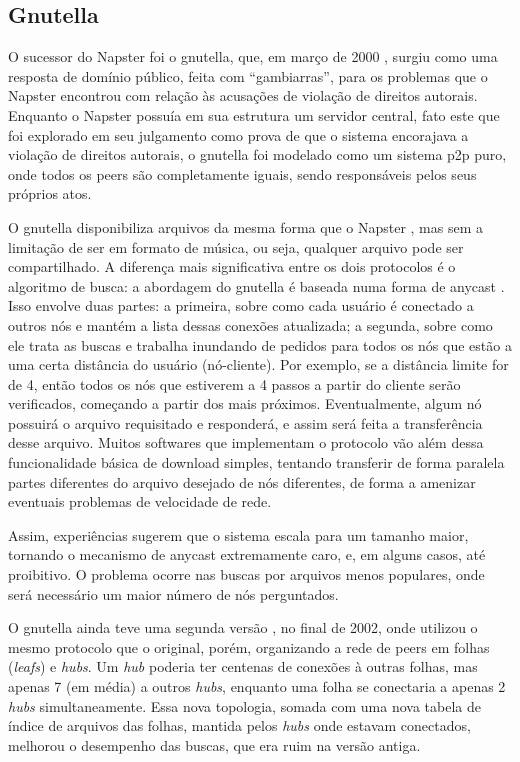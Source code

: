 \subsection*{Gnutella}

O sucessor do Napster foi o \gls{gnutella}, que, em março de 2000 \cite{wiki:gnutella},
surgiu como uma resposta de domínio público, feita com ``gambiarras'', para os problemas
que o Napster encontrou com relação às acusações de violação de direitos autorais.
Enquanto o Napster possuía em sua estrutura um servidor central, fato este que foi
explorado em seu julgamento como prova de que o sistema encorajava a violação de
direitos autorais, o \gls*{gnutella} foi modelado como um sistema \gls*{p2p} puro, onde
todos os \glspl*{peer} são completamente iguais, sendo responsáveis pelos seus próprios
atos.

O \gls*{gnutella} disponibiliza arquivos da mesma forma que o Napster \cite{book:birman}
, mas sem a limitação de ser em formato de música, ou seja, qualquer arquivo pode ser
compartilhado. A diferença mais significativa entre os dois protocolos é o algoritmo de
busca: a abordagem do \gls*{gnutella} é baseada numa forma de \gls{anycast} . Isso
envolve duas partes: a primeira, sobre como cada usuário é conectado a outros nós e
mantém a lista dessas conexões atualizada; a segunda, sobre como ele trata as buscas e
trabalha inundando de pedidos para todos os nós que estão a uma certa distância do
usuário (nó-cliente). Por exemplo, se a distância limite for de 4, então todos os nós
que estiverem a 4 passos a partir do cliente serão verificados, começando a partir dos
mais próximos. Eventualmente, algum nó possuirá o arquivo requisitado e responderá, e
assim será feita a transferência desse arquivo. Muitos softwares que implementam o
protocolo vão além dessa funcionalidade básica de download simples, tentando transferir
de forma paralela partes diferentes do arquivo desejado de nós diferentes, de forma a
amenizar eventuais problemas de velocidade de rede.

Assim, experiências sugerem que o sistema escala para um tamanho maior, tornando o
mecanismo de \gls*{anycast} extremamente caro, e, em alguns casos, até proibitivo. O
problema ocorre nas buscas por arquivos menos populares, onde será necessário um maior
número de nós perguntados.

O \gls*{gnutella} ainda teve uma segunda versão \cite{wiki:gnutella2}, no final de 2002,
onde utilizou o mesmo protocolo que o original, porém, organizando a rede de
\glspl*{peer} em folhas (\emph{leafs}) e \emph{hubs}. Um \emph{hub} poderia
ter centenas de conexões à outras folhas, mas apenas 7 (em média) a outros \emph{hubs},
enquanto uma folha se conectaria a apenas 2 \emph{hubs} simultaneamente. Essa nova
topologia, somada com uma nova tabela de índice de arquivos das folhas, mantida pelos
\emph{hubs} onde estavam conectados, melhorou o desempenho das buscas, que era ruim na
versão antiga.

